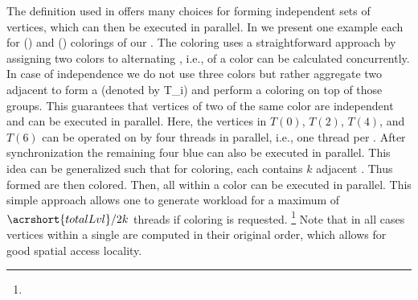  
The definition used in  offers many choices for
forming \DK independent sets of vertices, which can then be executed
in parallel.  In  we present one example each
for \DONE () and \DTWO ()
colorings of our \stex. The \DONE coloring uses a straightforward
approach by assigning two colors to alternating \levels, i.e., \levels
of a color can be calculated concurrently. In case of \DTWO
independence we do not use three colors but rather aggregate two
adjacent \levels to form a \textit{\levelGroup} (denoted by
\acrshort{T_i}) and perform a \DONE coloring on top of those
groups. This guarantees that vertices of two \levelGroups of the same
color are \DTWO independent and can be executed in parallel. Here, the
vertices in $T(0)$, $T(2)$, $T(4)$, and $T(6)$ can be operated on by
four threads in parallel, i.e., one thread per \levelGroup.  After
synchronization the remaining four blue \levelGroups can also be
executed in parallel. This idea can be generalized such that for \DK
coloring, each \levelGroup contains $k$ adjacent \levels.
Thus formed \levelGroups are then \DONE
colored. Then, all \levelGroups within a color can be executed in
parallel. This simple approach allows one to generate workload for
a maximum of ${\acrshort{totalLvl}}/{2 k}$ threads if \DK coloring is
requested. \footnote{} Note that in all cases vertices within a single \levelGroup
 are computed in their original order, which allows for good
spatial access locality.
 
